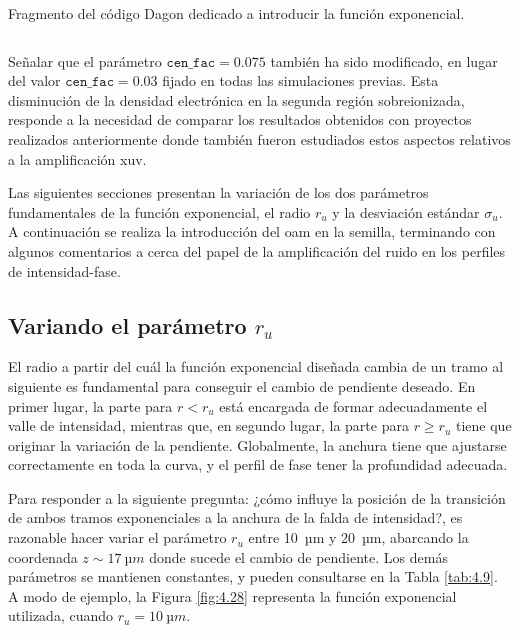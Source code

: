 \begin{longlisting}
  \caption{Fragmento del código Dagon dedicado a introducir la función exponencial.}
  \inputminted[firstline=1, lastline=80]{fortran}{Programas/plasma3Dt.f90}
  \label{cod:4.7}
\end{longlisting}

Señalar que el parámetro  $\texttt{cen\_fac}=0.075$ también ha sido modificado, en lugar del valor  $\texttt{cen\_fac}=0.03$ fijado en todas las simulaciones previas. Esta disminución de la densidad electrónica en la segunda región sobreionizada, responde a la necesidad de comparar los resultados obtenidos con proyectos realizados anteriormente donde también fueron estudiados estos aspectos relativos a la amplificación \acrshort{xuv}.

Las siguientes secciones presentan la variación de los dos parámetros fundamentales de la función exponencial, el radio $r_{u}$ y la desviación estándar $\sigma_{u}$. A continuación se realiza la introducción del \acrshort{oam} en la semilla, terminando con algunos comentarios a cerca del papel de la amplificación del ruido en los perfiles de intensidad-fase.

\subsection{Variando el parámetro $r_{u}$}\label{sec:4.3.1}
El radio a partir del cuál la función exponencial diseñada cambia de un tramo al siguiente es fundamental para conseguir el cambio de pendiente deseado. En primer lugar, la parte para $r<r_{u}$ está encargada de formar adecuadamente el valle de intensidad, mientras que, en segundo lugar, la parte para $r\geq r_{u}$ tiene que originar la variación de la pendiente. Globalmente, la anchura tiene que ajustarse correctamente en toda la curva, y el perfil de fase tener la profundidad adecuada.

Para responder a la siguiente pregunta: ¿cómo influye la posición de la transición de ambos tramos exponenciales a la anchura de la falda de intensidad?, es razonable hacer variar el parámetro $r_{u}$ entre \qty{10}{µm} y \qty{20}{µm}, abarcando la coordenada $z \sim \qty{17}{µm}$ donde sucede el cambio de pendiente. Los demás parámetros se mantienen constantes, y pueden consultarse en la Tabla \ref{tab:4.9}. A modo de ejemplo, la Figura \ref{fig:4.28} representa la función exponencial utilizada, cuando $r_{u}=\qty{10}{µm}$. 

